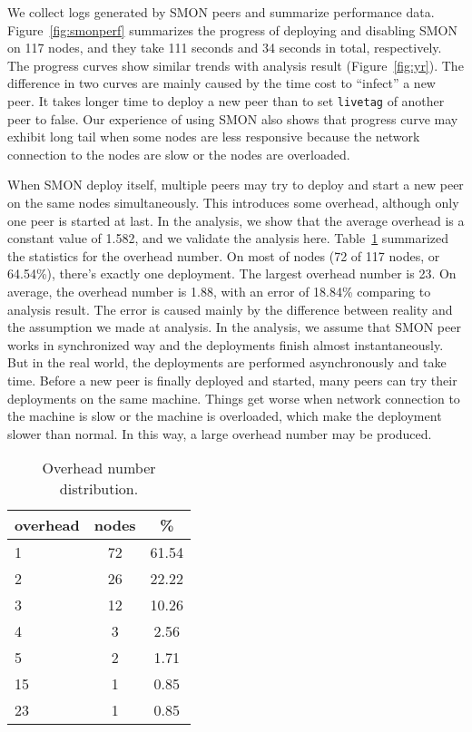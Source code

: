 We collect logs generated by SMON peers and summarize
performance data.  Figure~\ref{fig:smonperf} summarizes the
progress of deploying and disabling SMON on 117 nodes, and
they take 111 seconds and 34 seconds in total, respectively.
The progress curves show similar trends with analysis result
(Figure~\ref{fig:yr}). The difference in two curves are
mainly caused by the time cost to ``infect'' a new peer. It
takes longer time to deploy a new peer than to set
\texttt{livetag} of another peer to false. Our experience of
using SMON also shows that progress curve may exhibit long
tail when some nodes are less responsive because the network
connection to the nodes are slow or the nodes are
overloaded.

When SMON deploy itself, multiple peers may try to deploy
and start a new peer on the same nodes simultaneously. This
introduces some overhead, although only one peer is started
at last. In the analysis, we show that the average overhead
is a constant value of 1.582, and we validate the analysis
here. Table~\ref{tbl:overhead} summarized the statistics for
the overhead number. On most of nodes (72 of 117 nodes, or
64.54\%), there's exactly one deployment. The largest
overhead number is 23. On average, the overhead number is
1.88, with an error of 18.84\% comparing to analysis result.
The error is caused mainly by the difference between reality
and the assumption we made at analysis. In the analysis, we
assume that SMON peer works in synchronized way and the
deployments finish almost instantaneously. But in the real
world, the deployments are performed asynchronously and take
time. Before a new peer is finally deployed and started,
many peers can try their deployments on the same machine.
Things get worse when network connection to the machine is
slow or the machine is overloaded, which make the deployment
slower than normal. In this way, a large overhead number may
be produced.
\begin{table}[hbt]
\centering
\begin{tabular}{|l|c|c|}
\hline
overhead & nodes & \% \\
\hline
1 & 72 & 61.54 \\
2 & 26 & 22.22 \\
3 & 12 & 10.26 \\
4 & 3 & 2.56 \\
5 & 2 & 1.71 \\
15 & 1 & 0.85 \\
23 & 1 & 0.85 \\
\hline
\end{tabular}
\caption{Overhead number distribution.}
\label{tbl:overhead}
\end{table}

